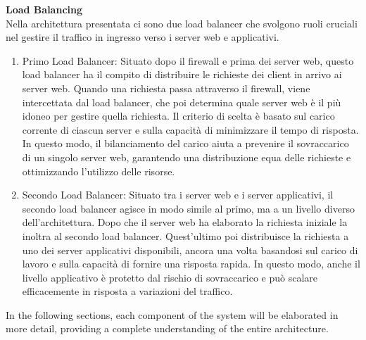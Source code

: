 \noindent \textbf{Load Balancing}\\
\noindent Nella architettura presentata ci sono due load balancer che svolgono ruoli cruciali nel gestire il traffico in ingresso verso i server web e applicativi.
\begin{enumerate}
    \item Primo Load Balancer: Situato dopo il firewall e prima dei server web, questo load balancer ha il compito di distribuire le richieste dei client in arrivo  ai server web. Quando una richiesta passa attraverso il firewall, viene intercettata dal load balancer, che poi determina quale server web è il più idoneo per gestire quella richiesta. Il criterio di scelta è basato sul carico corrente di ciascun server e  sulla capacità di minimizzare il tempo di risposta. In questo modo, il bilanciamento del carico aiuta a prevenire il sovraccarico di un singolo server web, garantendo una distribuzione equa delle richieste e ottimizzando l'utilizzo delle risorse.
    \item Secondo Load Balancer: Situato tra i server web e i server applicativi, il secondo load balancer agisce in modo simile al primo, ma a un livello diverso dell'architettura. Dopo che il server web ha elaborato la richiesta iniziale  la inoltra al secondo load balancer. Quest'ultimo poi distribuisce la richiesta a uno dei server applicativi disponibili, ancora una volta basandosi sul carico di lavoro e sulla capacità di fornire una risposta rapida. In questo modo, anche il livello applicativo è protetto dal rischio di sovraccarico e può scalare efficacemente in risposta a variazioni del traffico.
\end{enumerate}
\leavevmode 
\newline
In the following sections, each component of the system will be elaborated in more detail, providing a complete understanding of the entire architecture.

